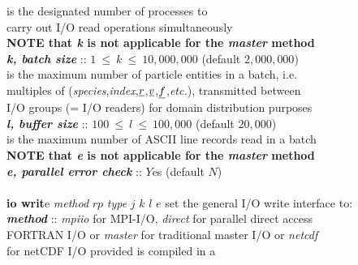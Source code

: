 \begin{tabbing}
\>                                              \> \phantom{xxxx} is the designated number of processes to \\
\>                                              \> \phantom{xxxx} carry out I/O read operations simultaneously \\
\>                                              \> {\bf NOTE that {\em k} is not applicable for the {\em master} method} \\
\>                                              \> \phantom{xxx} {\bf \em k, batch size} :: $1~\le~k~\le~10,000,000$ (default $2,000,000$) \\
\>                                              \> \phantom{xxxx} is the maximum number of particle entities in a batch, i.e. \\
\>                                              \> \phantom{xxxx} multiples of ({\em species},{\em index},$\mbox{$\underline{r}$}$,$\mbox{$\underline{v}$}$,$\mbox{$\underline{f}$}$,{\em etc.}), transmitted between \\
\>                                              \> \phantom{xxxx} I/O groups (= I/O readers) for domain distribution purposes \\
\>                                              \> {\bf \em l, buffer size} :: $100~\le~l~\le~100,000$ (default $20,000$) \\
\>                                              \> \phantom{x} is the maximum number of ASCII line records read in a batch \\
\>                                              \> {\bf NOTE that {\em e} is not applicable for the {\em master} method} \\
\>                                              \> \phantom{xxx} {\bf \em e, parallel error check} :: $Y$es (default $N$) \\
\>                                              \> \\
  \> {\bf io writ}e {\em method} $rp$ {\em type} $j$ $k$ $l$ $e$ \> set the general I/O write interface to: \\
\>                                              \> {\bf \em method} :: {\em mpiio} for MPI-I/O, {\em direct} for parallel direct access \\
\>                                              \> \phantom{x} FORTRAN I/O or {\em master} for traditional master I/O or {\em netcdf} \\
\>                                              \> \phantom{x} for netCDF I/O provided \D is compiled in a \\

\end{tabbing}
